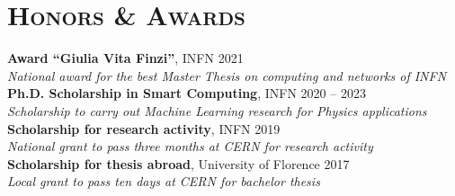 \newcommand{\scholarship}[4]
  {\normalsize \textbf{\color{maincolor} #1},
  {\color{hlcolor-1} #2} \hfill {\color{hlcolor-2} #3}\\
  {\color{iconcolor} \faMedal} \emph{\color{maincolor} #4}}


\section*{\textsc{Honors \& Awards}}
\begin{cvcontent}
  \scholarship{Award ``Giulia Vita Finzi''}{INFN}{2021}{National award for the best Master Thesis on computing and networks of INFN}
  \\ [3mm]
  \scholarship{Ph.D. Scholarship in Smart Computing}{INFN}{2020 -- 2023}{Scholarship to carry out Machine Learning research for Physics applications}
  \\ [3mm]
  \scholarship{Scholarship for research activity}{INFN}{2019}{National grant to pass three months at CERN for research activity}
  \\ [3mm]
  \scholarship{Scholarship for thesis abroad}{University of Florence}{2017}{Local grant to pass ten days at CERN for bachelor thesis}
\end{cvcontent}